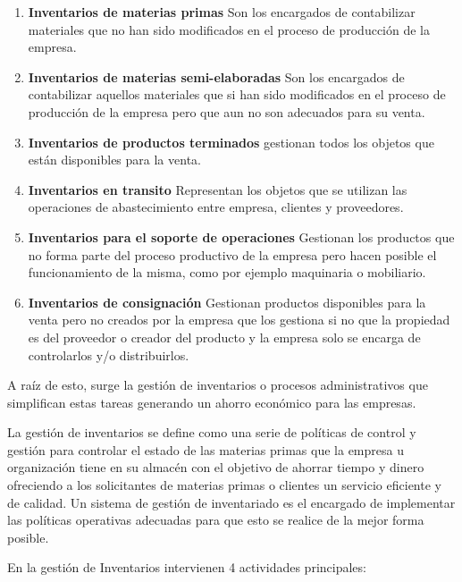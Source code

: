 \documentclass[a4paper,11pt]{book}
\begin{document}
\begin{enumerate}
\item \textbf{Inventarios de materias primas} Son los encargados de contabilizar materiales que no han sido modificados en el proceso de producción de la empresa.
\item \textbf{Inventarios de materias semi-elaboradas} Son los encargados de contabilizar aquellos materiales que si han sido modificados en el proceso de producción de la empresa pero que aun no son adecuados para su venta.
\item \textbf{Inventarios de productos terminados} gestionan todos los objetos que están disponibles para la venta.
\item \textbf{Inventarios en transito} Representan los objetos que se utilizan las operaciones de abastecimiento entre empresa, clientes y proveedores.
\item \textbf{Inventarios para el soporte de operaciones} Gestionan los productos que no forma parte del proceso productivo de la empresa pero hacen posible el funcionamiento de la misma, como por ejemplo maquinaria o mobiliario.
\item \textbf{Inventarios de consignación} Gestionan productos disponibles para la venta pero no creados por la empresa que los gestiona si no que la propiedad es del proveedor o creador del producto y la empresa solo se encarga de controlarlos y/o distribuirlos.
\end{enumerate}
 

A raíz de esto, surge la gestión de inventarios o procesos administrativos que simplifican estas tareas generando un ahorro económico para las empresas. 



La gestión de inventarios\cite{gestion} se define como una serie de políticas de control y gestión para controlar el estado de las materias primas que la empresa u organización tiene en su almacén con el objetivo de ahorrar tiempo y dinero ofreciendo a los solicitantes de materias primas o clientes un servicio eficiente y de calidad. Un sistema de gestión de inventariado es el encargado de implementar las políticas operativas adecuadas para que esto se realice de la mejor forma posible. 

En la gestión de Inventarios intervienen 4 actividades principales:
\end{document}
